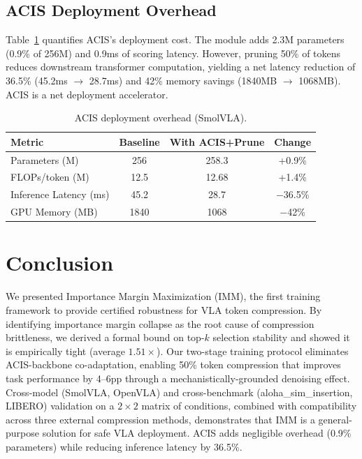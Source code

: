 \documentclass[10pt,twocolumn]{article}
\begin{document}
\subsection{ACIS Deployment Overhead}
\label{sec:overhead}

Table~\ref{tab:overhead} quantifies ACIS's deployment cost. The module adds 2.3M parameters (0.9\% of 256M) and 0.9ms of scoring latency. However, pruning 50\% of tokens reduces downstream transformer computation, yielding a net latency reduction of 36.5\% (45.2ms $\to$ 28.7ms) and 42\% memory savings (1840MB $\to$ 1068MB). ACIS is a net deployment accelerator.

\begin{table}[t]
\centering
\caption{ACIS deployment overhead (SmolVLA).}
\label{tab:overhead}
\begin{tabular}{lccc}
\toprule
Metric & Baseline & With ACIS+Prune & Change \\
\midrule
Parameters (M) & 256 & 258.3 & +0.9\% \\
FLOPs/token (M) & 12.5 & 12.68 & +1.4\% \\
Inference Latency (ms) & 45.2 & 28.7 & $-$36.5\% \\
GPU Memory (MB) & 1840 & 1068 & $-$42\% \\
\bottomrule
\end{tabular}
\end{table}

\section{Conclusion}
\label{sec:conclusion}

We presented Importance Margin Maximization (IMM), the first training framework to provide certified robustness for VLA token compression. By identifying importance margin collapse as the root cause of compression brittleness, we derived a formal bound on top-$k$ selection stability and showed it is empirically tight (average $1.51\times$). Our two-stage training protocol eliminates ACIS-backbone co-adaptation, enabling 50\% token compression that improves task performance by 4--6pp through a mechanistically-grounded denoising effect. Cross-model (SmolVLA, OpenVLA) and cross-benchmark (aloha\_sim\_insertion, LIBERO) validation on a $2 \times 2$ matrix of conditions, combined with compatibility across three external compression methods, demonstrates that IMM is a general-purpose solution for safe VLA deployment. ACIS adds negligible overhead (0.9\% parameters) while reducing inference latency by 36.5\%.
\end{document}
